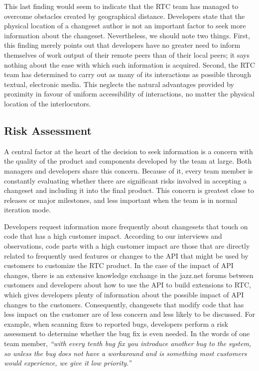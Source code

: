 This last finding would seem to indicate that the RTC team has managed to overcome obstacles created by geographical distance. Developers state that the physical location of a changeset author is not an important factor to seek more information about the changeset. Nevertheless, we should note two things. First, this finding merely points out that developers have no greater need to inform themselves of work output of their remote peers than of their local peers; it says nothing about the ease with which such information is acquired. Second, the RTC team has determined to carry out as many of its interactions as possible through textual, electronic media. This neglects the natural advantages provided by proximity in favour of uniform accessibility of interactions, no matter the physical location of the interlocutors.
\vspace{-2pt}




\subsection{Risk Assessment}

A central factor at the heart of the decision to seek information is a concern with the quality of the product and components developed by the team at large. Both managers and developers share this concern. Because of it, every team member is constantly evaluating whether there are significant risks involved in accepting a changeset and including it into the final product. This concern is greatest close to releases or major milestones, and less important when the team is in normal iteration mode.

Developers request information more frequently about changesets that touch on code that has a high customer impact. According to our interviews and observations, code parts with a high customer impact are those that are directly related to frequently used features or changes to the API that might be used by customers to customize the RTC product. In the case of the impact of API changes, there is an extensive knowledge exchange in the jazz.net forums between customers and developers about how to use the API to build extensions to RTC, which gives developers plenty of information about the possible impact of API changes to the customers. Consequently, changesets that modify code that has less impact on the customer are of less concern and less likely to be discussed. For example, when scanning fixes to reported bugs, developers perform a risk assessment to determine whether the bug fix is even needed. In the words of one team member, \emph{``with every tenth bug fix you introduce another bug to the system, so unless the bug does not have a workaround and is something most customers would experience, we give it low priority.''}

